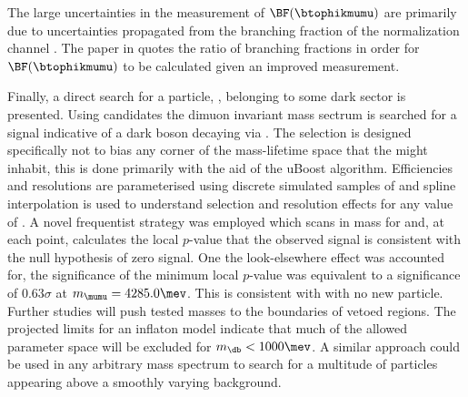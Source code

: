 The large uncertainties in the measurement of $\BF(\btophikmumu)$ are primarily due to
uncertainties propagated from the branching fraction of the normalization channel \btojpsiphik.
The paper in  quotes the ratio of branching fractions in order for
$\BF(\btophikmumu)$ to be calculated given an improved measurement.


Finally, a direct search for a \np particle, \db, belonging to some dark sector is presented.
Using
\btokstrmumu candidates the dimuon invariant mass sectrum is searched for a signal indicative of a
dark boson decaying via \dbtomumu.
The selection is designed specifically not to bias any corner of the mass-lifetime space that the
\db might inhabit, this is done primarily with the aid of the uBoost algorithm.
Efficiencies and resolutions are parameterised using discrete simulated samples of \btokstrdb
and spline interpolation is used to understand selection and resolution effects for any value of
\mass{\db}.
A novel frequentist strategy was employed which scans in mass for and, at each point, calculates
the local $p$-value that the observed signal is consistent with the null hypothesis of zero signal.
One the look-elsewhere effect was accounted for, the significance of the minimum local $p$-value
was equivalent to a significance of
$0.63\sigma$ at $m_{\mumu}=4285.0\mev$.
This is consistent with with no new particle.
Further studies will push tested masses to the boundaries of vetoed regions.
The projected limits for an inflaton model indicate that much of the allowed parameter space will
be excluded for $m_\db<1000\mev$.
A similar approach could be used in any arbitrary mass spectrum to search for a multitude of
particles appearing above a smoothly varying background.


